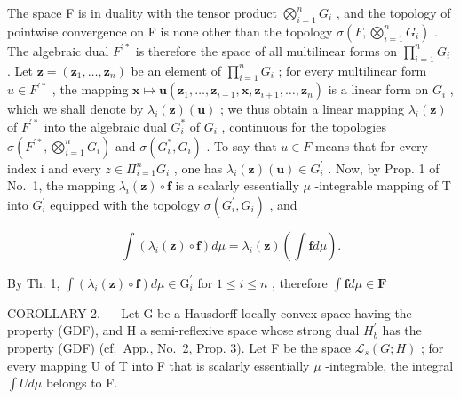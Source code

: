 The space F is in duality with the tensor product \(\bigotimes_{i=1}^{n}G_{i}\) , and the topology of pointwise convergence on F is none other than the topology \(\sigma(F,\bigotimes_{i=1}^{n}G_{i})\) . The algebraic dual \(F^{\prime*}\) is therefore the space of all multilinear forms on \(\prod_{i=1}^{n}G_{i}\) . Let \(\mathbf{z}=(\mathbf{z}_{1},\ldots,\mathbf{z}_{n})\) be an element of \(\prod_{i=1}^{n}G_{i}\) ; for every multilinear form \(u\in F^{\prime*}\) , the mapping \(\mathbf{x}\mapsto\mathbf{u}(\mathbf{z}_{1},\ldots,\mathbf{z}_{i-1},\mathbf{x},\mathbf{z}_{i+1},\ldots,\mathbf{z}_{n})\) is a linear form on \(G_{i}\) , which we shall denote by \(\lambda_{i}(\mathbf{z})(\mathbf{u})\) ; we thus obtain a linear mapping \(\lambda_{i}(\mathbf{z})\) of \(F^{\prime*}\) into the algebraic dual \(G_{i}^{*}\) of \(G_{i}\) , continuous for the topologies \(\sigma(F^{\prime*},\bigotimes_{i=1}^{n}G_{i})\) and \(\sigma(G_{i}^{*},G_{i})\) . To say that \(u\in F\) means that for every index i and every \(z\in\Pi_{i=1}^{n}G_{i}\) , one has \(\lambda_{i}(\mathbf{z})(\mathbf{u})\in G_{i}^{\prime}\) . Now, by Prop. 1 of No.~1, the mapping \(\lambda_{i}(\mathbf{z})\circ\mathbf{f}\) is a scalarly essentially \(\mu\) -integrable mapping of T into \(G_{i}^{\prime}\) equipped with the topology \(\sigma(G_{i}^{\prime},G_{i})\) , and

\[
\int \left(\lambda_ {i} (\mathbf {z}) \circ \mathbf {f}\right) d \mu = \lambda_ {i} (\mathbf {z}) \left(\int \mathbf {f} d \mu\right).
\]

By Th. 1, \(\int (\lambda_i(\mathbf{z})\circ \mathbf{f})d\mu \in \mathrm{G}_i^\prime\) for \(1\leqslant i\leqslant n\) , therefore \(\int \mathbf{f}d\mu \in \mathbf{F}\)

COROLLARY 2. --- Let G be a Hausdorff locally convex space having the property (GDF), and H a semi-reflexive space whose strong dual \(H_{b}^{\prime}\) has the property (GDF) (cf.~App., No.~2, Prop. 3). Let F be the space \(\mathcal{L}_{s}(G;H)\) ; for every mapping U of T into F that is scalarly essentially \(\mu\) -integrable, the integral \(\int U d\mu\) belongs to F.


